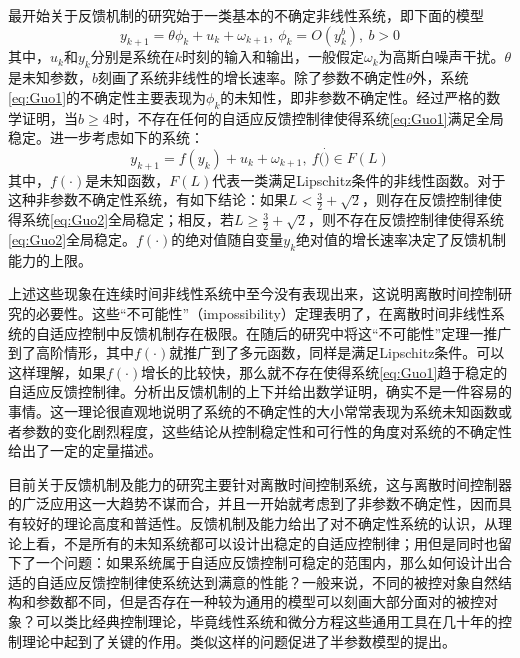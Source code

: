 最开始关于反馈机制的研究始于一类基本的不确定非线性系统，即下面的模型
\begin{equation}%
\label{eq:Guo1}
y_{k+1} = \theta \phi_{k} + u_{k} + \omega_{k+1},\ \phi_{k}=O(y_{k}^{b}),\ b>0
\end{equation}
其中，$u_{k}$和$y_{k}$分别是系统在$k$时刻的输入和输出，一般假定$\omega_{k}$为高斯白噪声干扰。$\theta$是未知参数，$b$刻画了系统非线性的增长速率。除了参数不确定性$\theta$外，系统\eqref{eq:Guo1}的不确定性主要表现为$\phi_{k}$的未知性，即非参数不确定性。经过严格的数学证明，当$b\geq4$时，不存在任何的自适应反馈控制律使得系统\eqref{eq:Guo1}满足全局稳定。进一步考虑如下的系统：
\begin{equation}%
\label{eq:Guo2}
y_{k+1} = f(y_{k}) + u_{k} + \omega_{k+1},\ f(\dot)\in F(L)
\end{equation}
其中，$f(\cdot)$是未知函数，$F(L)$代表一类满足Lipschitz条件的非线性函数。对于这种非参数不确定性系统，有如下结论：如果$L<\frac32+\sqrt{2}$，则存在反馈控制律使得系统\eqref{eq:Guo2}全局稳定；相反，若$L\geq\frac32+\sqrt{2}$，则不存在反馈控制律使得系统\eqref{eq:Guo2}全局稳定。$f(\cdot)$的绝对值随自变量$y_{k}$绝对值的增长速率决定了反馈机制能力的上限。

上述这些现象在连续时间非线性系统中至今没有表现出来，这说明离散时间控制研究的必要性。这些“不可能性”（impossibility）定理表明了，在离散时间非线性系统的自适应控制中反馈机制存在极限。在随后的研究中将这“不可能性”定理一推广到了高阶情形，其中$f(\cdot)$就推广到了多元函数，同样是满足Lipschitz条件。可以这样理解，如果$f(\cdot)$增长的比较快，那么就不存在使得系统\eqref{eq:Guo1}趋于稳定的自适应反馈控制律。分析出反馈机制的上下并给出数学证明，确实不是一件容易的事情。这一理论很直观地说明了系统的不确定性的大小常常表现为系统未知函数或者参数的变化剧烈程度，这些结论从控制稳定性和可行性的角度对系统的不确定性给出了一定的定量描述。

目前关于反馈机制及能力的研究主要针对离散时间控制系统，这与离散时间控制器的广泛应用这一大趋势不谋而合，并且一开始就考虑到了非参数不确定性，因而具有较好的理论高度和普适性。反馈机制及能力给出了对不确定性系统的认识，从理论上看，不是所有的未知系统都可以设计出稳定的自适应控制律；用但是同时也留下了一个问题：如果系统属于自适应反馈控制可稳定的范围内，那么如何设计出合适的自适应反馈控制律使系统达到满意的性能？一般来说，不同的被控对象自然结构和参数都不同，但是否存在一种较为通用的模型可以刻画大部分面对的被控对象？可以类比经典控制理论，毕竟线性系统和微分方程这些通用工具在几十年的控制理论中起到了关键的作用。类似这样的问题促进了半参数模型的提出。

